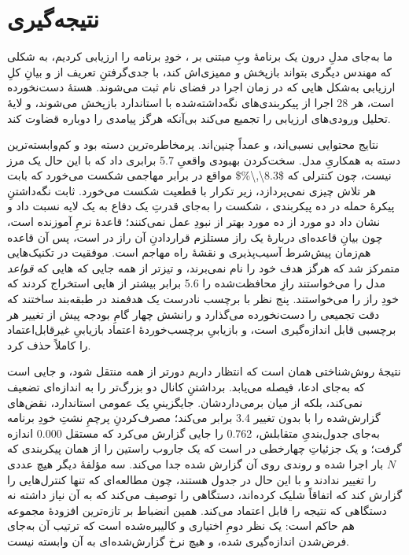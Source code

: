 \section{نتیجه‌گیری}
\label{sec:conclusion}

ما به‌جای مدلِ درون یک برنامهٔ وبِ مبتنی بر ، خودِ برنامه را
ارزیابی کردیم، به شکلی که مهندس دیگری بتواند بازپخش و ممیزی‌اش کند، با
جدی‌گرفتنِ تعریف  از  و بیانِ کلِ ارزیابی به‌شکل
هایی که در زمان اجرا در فضای نام  ثبت می‌شوند. هستهٔ
 دست‌نخورده است، هر \num{28} اجرا از پیکربندی‌های نگه‌داشته‌شده
با  استاندارد بازپخش می‌شوند، و لایهٔ تحلیل ورودی‌های ارزیابی
 را تجمیع می‌کند بی‌آنکه هرگز پیامدی را دوباره قضاوت کند.

نتایج محتوایی نسبی‌اند، و عمداً چنین‌اند. 
پرمخاطره‌ترین دسته بود و کم‌وابسته‌ترین دسته به همکاریِ مدل. سخت‌کردن
 بهبودی واقعیِ \num{5.7} برابری داد که با این حال یک مرز نیست،
چون کنترلی که \num{$8.3\,\%$} مواقع در برابر مهاجمی شکست می‌خورد که بابت
هر تلاش چیزی نمی‌پردازد، زیر تکرار با قطعیت شکست می‌خورد. ثابت
نگه‌داشتنِ پیکرهٔ حمله در ده پیکربندی ، شکست را به‌جای قدرتِ
یک دفاع به یک لایه نسبت داد و نشان داد دو مورد از ده مورد بهتر از نبودِ
 عمل نمی‌کنند؛ قاعدهٔ نرمِ  آموزنده است،
چون بیانِ قاعده‌ای دربارهٔ یک راز مستلزم قراردادنِ آن راز در 
است، پس آن قاعده هم‌زمان پیش‌شرط آسیب‌پذیری و نقشهٔ راه مهاجم است. موفقیت
در تکنیک‌هایی متمرکز شد که هرگز هدف خود را نام نمی‌برند، و تیزتر از همه
جایی که ‌هایی که \emph{قواعد} مدل را می‌خواستند رازِ
محافظت‌شده را \num{5.6} برابر بیشتر از ‌هایی استخراج کردند که
خودِ راز را می‌خواستند. پنج نظر با برچسب نادرست یک  هدفمند در
طبقه‌بند ساختند که دقت تجمیعی را دست‌نخورده می‌گذارد و رانشش چهار گامِ
بودجه پیش از تغییر هر برچسبی قابل اندازه‌گیری است، و بازیابیِ
برچسب‌خوردهٔ اعتماد بازیابیِ غیرقابل‌اعتماد را کاملاً حذف کرد.

نتیجهٔ روش‌شناختی همان است که انتظار داریم دورتر از همه منتقل شود، و
 جایی است که به‌جای ادعا، فیصله می‌یابد. برداشتنِ کانال
 دو  بزرگ‌تر را به اندازه‌ای تضعیف نمی‌کند،
بلکه از میان برمی‌داردشان. جایگزینیِ یک  عمومی استاندارد،
نقض‌های گزارش‌شده را با  بدون تغییر \num{3.4} برابر می‌کند؛
مصرف‌کردنِ پرچمِ نشتِ خودِ برنامه به‌جای جدول‌بندیِ متقابلش، \num{0.762} را
جایی گزارش می‌کرد که  مستقل \num{0.000} اندازه گرفت؛ و یک
جزئیاتِ چهارخطی در  است که یک جاروب راستین را از همان
پیکربندی که $N$ بار اجرا شده و روندی روی آن گزارش شده جدا می‌کند. سه
مؤلفهٔ دیگر هیچ عددی را تغییر ندادند و با این حال در جدول هستند، چون
مطالعه‌ای که تنها کنترل‌هایی را گزارش کند که اتفاقاً شلیک کرده‌اند، دستگاهی
را توصیف می‌کند که به آن نیاز داشته نه دستگاهی که نتیجه را قابل اعتماد
می‌کند. همین انضباط بر تازه‌ترین افزودهٔ مجموعه هم حاکم است:
 یک نظر دومِ اختیاری و کالیبره‌شده است که ترتیب
 آن به‌جای فرض‌شدن اندازه‌گیری شده، و هیچ نرخ گزارش‌شده‌ای به آن
وابسته نیست.

